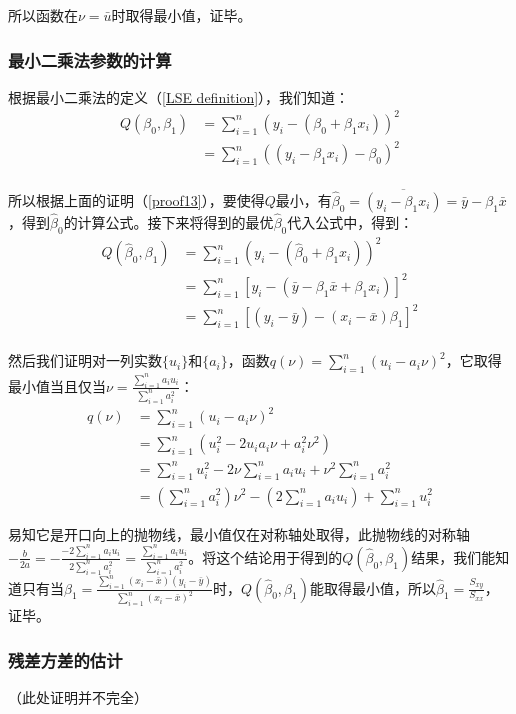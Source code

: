 \documentclass[UTF8]{ctexart}
\begin{document}
所以函数在$\nu=\bar u$时取得最小值，证毕。

\subsubsection{最小二乘法参数的计算}
\label{proof14}
根据最小二乘法的定义（\ref{LSE definition}），我们知道：
\begin{align*}
	Q(\beta_0,\beta_1)&=\sum_{i=1}^n(y_i-(\beta_0+\beta_1x_i))^2\\
	&=\sum_{i=1}^n((y_i-\beta_1x_i)-\beta_0)^2\\
\end{align*}

所以根据上面的证明（\ref{proof13}），要使得$Q$最小，有$\hat\beta_0=\overline{(y_i-\beta_1x_i)}=\bar y-\beta_1\bar x$，得到$\hat\beta_0$的计算公式。接下来将得到的最优$\hat\beta_0$代入公式中，得到：
\begin{align*}
	Q(\hat\beta_0,\beta_1)&=\sum_{i=1}^n(y_i-(\hat\beta_0+\beta_1x_i))^2\\
	&=\sum_{i=1}^n[y_i-(\bar y-\beta_1\bar x+\beta_1x_i)]^2\\
	&=\sum_{i=1}^n[(y_i-\bar y)-(x_i-\bar x)\beta_1]^2\\
\end{align*}

然后我们证明对一列实数$\{u_i\}$和$\{a_i\}$，函数$q(\nu)=\sum_{i=1}^n(u_i-a_i\nu)^2$，它取得最小值当且仅当$\nu=\frac{\sum_{i=1}^na_iu_i}{\sum_{i=1}^na_i^2}$：
\begin{align*}
	q(\nu)&=\sum_{i=1}^n(u_i-a_i\nu)^2\\
	&=\sum_{i=1}^n(u_i^2-2u_ia_i\nu+a_i^2\nu^2)\\
	&=\sum_{i=1}^nu_i^2-2\nu\sum_{i=1}^na_iu_i+\nu^2\sum_{i=1}^na_i^2\\
	&=\left(\sum_{i=1}^na_i^2\right)\nu^2-\left(2\sum_{i=1}^na_iu_i\right)+\sum_{i=1}^nu_i^2
\end{align*}

易知它是开口向上的抛物线，最小值仅在对称轴处取得，此抛物线的对称轴$-\frac{b}{2a}=-\frac{-2\sum_{i=1}^na_iu_i}{2\sum_{i=1}^na_i^2}=\frac{\sum_{i=1}^na_iu_i}{\sum_{i=1}^na_i^2}$。将这个结论用于得到的$Q(\hat\beta_0,\beta_1)$结果，我们能知道只有当$\beta_1=\frac{\sum_{i=1}^n(x_i-\bar x)(y_i-\bar y)}{\sum_{i=1}^n(x_i-\bar x)^2}$时，$Q(\hat\beta_0,\beta_1)$能取得最小值，所以$\hat\beta_1=\frac{S_{xy}}{S_{xx}}$，证毕。

\subsubsection{残差方差的估计}
\label{proof15}
（此处证明并不完全）
\end{document}
